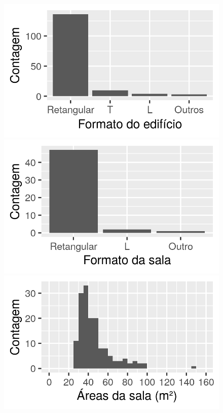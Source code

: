 \documentclass[brazil,hardcopy,openany]{ufscthesis} %
\begin{document}
\begin{figure}[H]
\begin{minipage}{.33\textwidth}
	\end{minipage}
	\centering
	\begin{minipage}{.33\textwidth}
		\centering
		\includegraphics[width=\linewidth]{img/hist_formato.png}
	\end{minipage}%
	\begin{minipage}{.33\textwidth}
		\centering
		\includegraphics[width=\linewidth]{img/hist_formato_sala.png}
	\end{minipage}%
	\begin{minipage}{.33\textwidth}
		\centering
		\includegraphics[width=\linewidth]{img/hist_area_zonas.png}

\end{minipage}
\end{figure}
\end{document}

